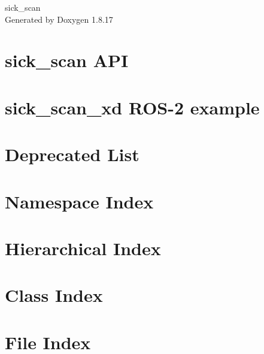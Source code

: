 \let\mypdfximage\pdfximage\def\pdfximage{\immediate\mypdfximage}\documentclass[twoside]{book}
\newcommand{\+}{\discretionary{\mbox{\scriptsize$\hookleftarrow$}}{}{}}
\newcommand{\clearemptydoublepage}{%
  \newpage{\pagestyle{empty}\cleardoublepage}%
}
\begin{document}
\hypersetup{pageanchor=false,
             bookmarksnumbered=true,
             pdfencoding=unicode
            }
\begin{titlepage}
\vspace*{7cm}
\begin{center}%
{\Large sick\+\_\+scan }\\
\vspace*{1cm}
{\large Generated by Doxygen 1.8.17}\\
\end{center}
\end{titlepage}
\clearemptydoublepage
{}
\tableofcontents
\clearemptydoublepage
{}
\hypersetup{pageanchor=true}

\chapter{sick\+\_\+scan A\+PI}
\label{index}\hypertarget{index}{}
\chapter{sick\+\_\+scan\+\_\+xd R\+O\+S-\/2 example}
\label{md__home_nls_SHK_Arbeit_volksbot_src_sick_scan_xd_src_sick_scan_xd_examples_ros2_example_application_README}

\chapter{Deprecated List}
\label{deprecated}

\chapter{Namespace Index}

\chapter{Hierarchical Index}

\chapter{Class Index}

\chapter{File Index}

\end{document}
